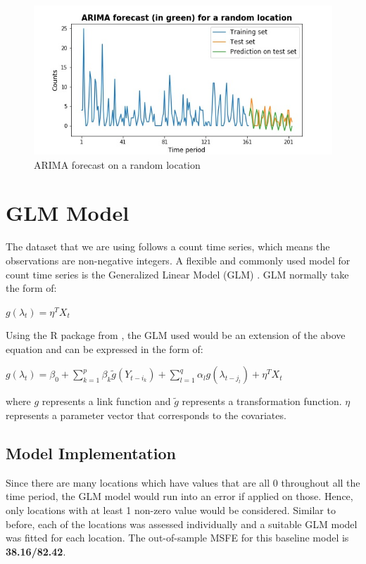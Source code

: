 \documentclass[12pt, letterpaper] {article}
\begin{document}
\begin{figure}[H]
    \centering
    \includegraphics[width=\textwidth]{Images/forecast_example.jpg}
    \caption{ARIMA forecast on a random location}
    \label{fig:ARIMA forecast on a random location}
\end{figure}


\section{GLM Model}
The dataset that we are using follows a count time series, which means the observations are non-negative integers. A flexible and commonly used model for count time series is the Generalized Linear Model (GLM) \cite{Nelder1972}. GLM normally take the form of:

\begin{center}
    $\displaystyle g(\lambda_t)= \eta^T X_t$
\end{center}

\noindent Using the R package from \cite{Tobias2017}, the GLM used would be an extension of the above equation and can be expressed in the form of:

\begin{center}
    $\displaystyle g(\lambda_t)=\beta_0 + \sum_{k=1}^{p}\beta_k\tilde{g}(Y_{t-i_k}) + \sum_{\mathit{l}=1}^{q}\alpha_\mathit{l} g(\lambda_{t-j_\mathit{l}}) + \eta^T X_t$
\end{center}

\noindent where $g$ represents a link function and $ \tilde{g}$ represents a transformation function. $\eta$ represents a parameter vector that corresponds to the covariates. 

\subsection{Model Implementation}
\noindent Since there are many locations which have values that are all 0 throughout all the time period, the GLM model would run into an error if applied on those. Hence, only locations with at least 1 non-zero value would be considered. Similar to before, each of the locations was assessed individually and a suitable GLM model was fitted for each location. The out-of-sample MSFE for this baseline model is \textbf{38.16/82.42}. 
\end{document}

